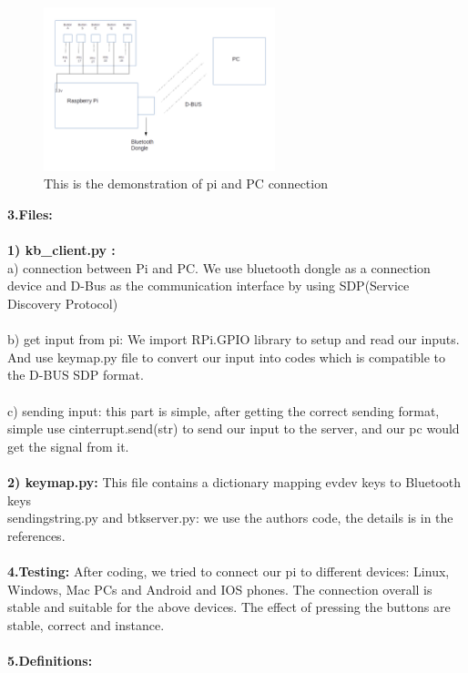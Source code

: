 \documentclass[a4paper]{article}
\begin{document}
\begin{figure}
\centering
\includegraphics[width=0.6\textwidth]{pidemo.png}
\caption{\label{fig:pi}This is the demonstration of pi and PC connection}
\end{figure}

\textbf{3.Files:} \\\\
\textbf{1) kb\_client.py :}\\
a) connection between Pi and PC. We use bluetooth dongle as a connection device and D-Bus as the communication interface by using SDP(Service Discovery Protocol)
\\\\
b) get input from pi: We import RPi.GPIO library to setup and read our inputs. And use keymap.py file to convert our input into codes which is compatible to the D-BUS SDP format.
\\\\
c) sending input:	this part is simple, after getting the correct sending format, simple use cinterrupt.send(str) to send our input to the server, and our pc would get the signal from it.
\\\\
\textbf{2) keymap.py:} This file contains a dictionary mapping evdev keys to Bluetooth keys \\
sendingstring.py and btkserver.py: we use the authors code, the details is in the references.
\\\\
\textbf{4.Testing:} After coding, we tried to connect our pi to different devices: Linux, Windows, Mac PCs and Android and IOS phones. The connection overall is stable and suitable for the above devices. The effect of pressing the buttons are stable, correct and instance.
\\\\
\textbf{5.Definitions:} \\\\
\end{document}
